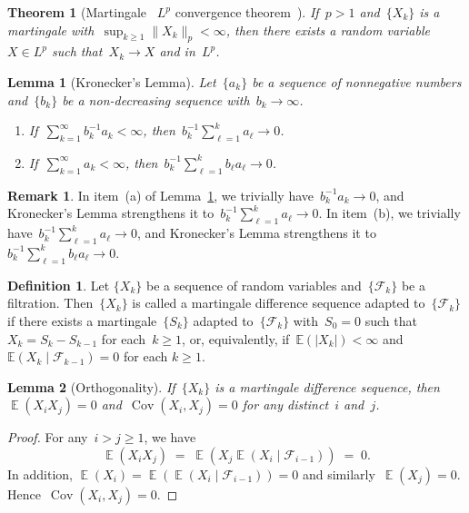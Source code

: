 \documentclass[12pt,a4paper]{article}  %
\newcounter{cite}
\newtheorem{theorem}{Theorem}[section]
\newtheorem{lemma}{Lemma}[section]
\theoremstyle{definition}
\newtheorem{definition}{Definition}[section]
\newtheorem{remark}{Remark}[section]
\numberwithin{equation}{section}
\newcommand{\FF}{\mathcal{F}}
\newcommand{\as}{{\text{a.s.}}\xspace}
\DeclareMathOperator{\cov}{Cov}
\DeclareMathOperator{\expc}{\mathbb{E}}
\begin{document}
\begin{theorem}[Martingale ~$L^p$ convergence theorem~\mbox{\cite[Theorem~4.4.6]{Durrett_2019}}] \label{th:mlp}
    If~$p> 1$ and~$\{X_k\}$ is a martingale with~$\sup_{k\ge 1} \|X_k\|_p< \infty$,
    then there exists a random variable~$X\in L^p$ such that~$X_k\to X$ \as and in~$L^p$.
\end{theorem}

\begin{lemma}[Kronecker's Lemma]
    \label{lem:kronecker}
    Let~$\{a_k\}$ be a sequence of nonnegative numbers and~$\{b_k\}$ be a non-decreasing sequence
    with~$b_k\to \infty$.
    \begin{enumerate}
        \item If~$\sum_{k=1}^\infty b_k^{-1}a_k < \infty$, then~$b_k^{-1}\sum_{\ell=1}^k a_\ell\to 0$.
        \item If~$\sum_{k=1}^\infty a_k < \infty$, then~$b_k^{-1}\sum_{\ell=1}^k b_\ell a_\ell\to 0$.
    \end{enumerate}
\end{lemma}

\begin{remark}
    \label{rem:kronecker}
    In item~(a) of Lemma~\ref{lem:kronecker}, we trivially have~$b_k^{-1} a_k\to 0$,
    and Kronecker's Lemma strengthens it to~$b_k^{-1}\sum_{\ell=1}^k a_\ell\to 0$.
    In item~(b), we trivially have~$b_k^{-1} \sum_{\ell=1}^k a_\ell\to 0$,
    and Kronecker's Lemma strengthens it to~$b_k^{-1}\sum_{\ell=1}^k b_\ell a_\ell\to 0$.
\end{remark}

\begin{definition}
    \label{def:md}
    Let $\{X_k\}$ be a sequence of random variables and~$\{\FF_k\}$ be a filtration.
    Then~$\{X_k\}$ is called a martingale difference sequence
    adapted to~$\{\FF_k\}$ if there exists a martingale~$\{S_k\}$ adapted to~$\{\FF_k\}$
    with~$S_0 = 0$ such that~$X_k = S_k - S_{k-1}$ for each~$k\ge 1$, or, equivalently,
    if~$\mathbb{E}(|X_k|) < \infty$ and $\mathbb{E}(X_k \mathrel{|} \FF_{k-1}) = 0$ \as for each $k \ge 1$.
\end{definition}

\begin{lemma}[Orthogonality]
    \label{lem:orth}
    If~$\{X_k\}$ is a martingale difference sequence, then
    $\expc(X_iX_j) = 0$ and~$\cov(X_i, X_j) = 0$ for any distinct~$i$ and~$j$.
\end{lemma}

\begin{proof}
    For any~$i > j \ge 1$, we have
    \[
        \expc(X_iX_j) \;=\;  \expc(X_j\expc(X_i\mathrel{|}\FF_{i-1})) \;=\; 0.
    \]
    In addition, $\expc(X_i) = \expc(\expc(X_i\mathrel{|}\FF_{i-1})) = 0$ and
    similarly~$\expc(X_j) = 0$. Hence~$\cov(X_i, X_j) = 0$.
\end{proof}
\end{document}
